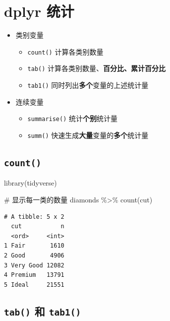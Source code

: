 \documentclass[
  letterpaper,
]{ctexbook}
\newenvironment{Shaded}{\begin{snugshade}}{\end{snugshade}}
\newcommand{\CommentTok}[1]{\textcolor[rgb]{0.37,0.37,0.37}{#1}}
\newcommand{\FunctionTok}[1]{\textcolor[rgb]{0.28,0.35,0.67}{#1}}
\newcommand{\NormalTok}[1]{\textcolor[rgb]{0.00,0.23,0.31}{#1}}
\newcommand{\SpecialCharTok}[1]{\textcolor[rgb]{0.37,0.37,0.37}{#1}}
\providecommand{\tightlist}{%
  \setlength{\itemsep}{0pt}\setlength{\parskip}{0pt}}\usepackage{longtable,booktabs,array}
\begin{document}
\hypertarget{dplyr-ux7edfux8ba1}{%
\chapter{dplyr 统计}\label{dplyr-ux7edfux8ba1}}

\begin{itemize}
\tightlist
\item
  类别变量

  \begin{itemize}
  \tightlist
  \item
    \texttt{count()} 计算各类别数量
  \item
    \texttt{tab()}
    计算各类别数量、{\textbf{百分比、累计百分比}}
  \item
    \texttt{tab1()} 同时列出{\textbf{多个}}变量的上述统计量
  \end{itemize}
\item
  连续变量

  \begin{itemize}
  \tightlist
  \item
    \texttt{summarise()} 统计{\textbf{个别}}统计量
  \item
    \texttt{summ()}
    快速生成{\textbf{大量}}变量的{\textbf{多个}}统计量
  \end{itemize}
\end{itemize}

\hypertarget{count}{%
\section{\texorpdfstring{\texttt{count()}}{count()}}\label{count}}

\begin{Shaded}
\begin{Highlighting}[]
\FunctionTok{library}\NormalTok{(tidyverse)}

\CommentTok{\# 显示每一类的数量}
\NormalTok{diamonds }\SpecialCharTok{\%\textgreater{}\%}
  \FunctionTok{count}\NormalTok{(cut)}
\end{Highlighting}
\end{Shaded}

\begin{verbatim}
# A tibble: 5 x 2
  cut           n
  <ord>     <int>
1 Fair       1610
2 Good       4906
3 Very Good 12082
4 Premium   13791
5 Ideal     21551
\end{verbatim}

\hypertarget{tab-ux548c-tab1}{%
\section{\texorpdfstring{\texttt{tab()} 和
\texttt{tab1()}}{tab() 和 tab1()}}\label{tab-ux548c-tab1}}
\end{document}
